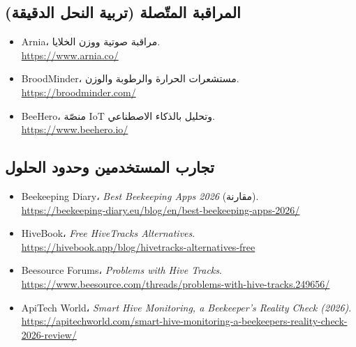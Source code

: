 \subsection*{المراقبة المتّصلة (تربية النحل الدقيقة)}
\begin{itemize}
  \item \textenglish{Arnia}، مراقبة صوتية ووزن الخلايا.\\ \url{https://www.arnia.co/}
  \item \textenglish{BroodMinder}، مستشعرات الحرارة والرطوبة والوزن.\\ \url{https://broodminder.com/}
  \item \textenglish{BeeHero}، منصّة IoT وتحليل بالذكاء الاصطناعي.\\ \url{https://www.beehero.io/}
\end{itemize}

\subsection*{تجارب المستخدمين وحدود الحلول}
\begin{itemize}
  \item \textenglish{Beekeeping Diary}، \emph{\textenglish{Best Beekeeping Apps 2026}} (مقارنة).\\ \url{https://beekeeping-diary.eu/blog/en/best-beekeeping-apps-2026/}
  \item \textenglish{HiveBook}، \emph{\textenglish{Free HiveTracks Alternatives}}.\\ \url{https://hivebook.app/blog/hivetracks-alternatives-free}
  \item \textenglish{Beesource Forums}، \emph{\textenglish{Problems with Hive Tracks}}.\\ \url{https://www.beesource.com/threads/problems-with-hive-tracks.249656/}
  \item \textenglish{ApiTech World}، \emph{\textenglish{Smart Hive Monitoring, a Beekeeper's Reality Check (2026)}}.\\ \url{https://apitechworld.com/smart-hive-monitoring-a-beekeepers-reality-check-2026-review/}
\end{itemize}
